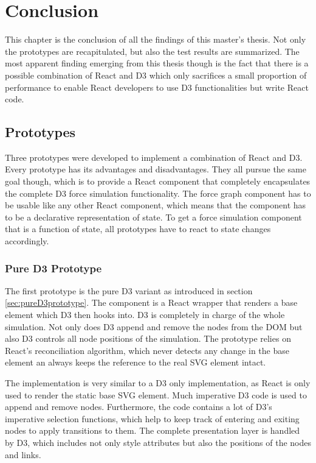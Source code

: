 \chapter{Conclusion}
\label{cha:conclusion}

This chapter is the conclusion of all the findings of this master's thesis. Not only the prototypes are recapitulated, but also the test results are summarized. The most apparent finding emerging from this thesis though is the fact that there is a possible combination of React and D3 which only sacrifices a small proportion of performance to enable React developers to use D3 functionalities but write React code.

\section{Prototypes}

Three prototypes were developed to implement a combination of React and D3. Every prototype has its advantages and disadvantages. They all pursue the same goal though, which is to provide a React component that completely encapsulates the complete D3 force simulation functionality. The force graph component has to be usable like any other React component, which means that the component has to be a declarative representation of state. To get a force simulation component that is a function of state, all prototypes have to react to state changes accordingly.

\subsection{Pure D3 Prototype}

The first prototype is the pure D3 variant as introduced in section \ref{sec:pureD3prototype}. The component is a React wrapper that renders a base element which D3 then hooks into. D3 is completely in charge of the whole simulation. Not only does D3 append and remove the nodes from the DOM but also D3 controls all node positions of the simulation. The prototype relies on React's reconciliation algorithm, which never detects any change in the base element an always keeps the reference to the real SVG element intact.

The implementation is very similar to a D3 only implementation, as React is only used to render the static base SVG element. Much imperative D3 code is used to append and remove nodes. Furthermore, the code contains a lot of D3's imperative selection functions, which help to keep track of entering and exiting nodes to apply transitions to them. The complete presentation layer is handled by D3, which includes not only style attributes but also the positions of the nodes and links.

